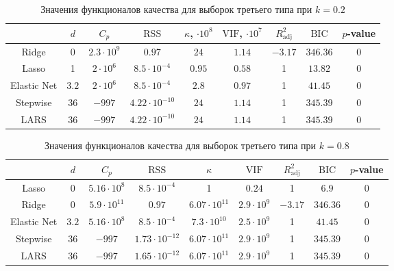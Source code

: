 \documentclass[a4paper,12pt]{article}
\newcommand{\vif}{\mathrm{VIF}}
\newcommand{\rss}{\mathrm{RSS}}
\newcommand{\bic}{\mathrm{BIC}}
\newcommand{\radj}{R_{\text{adj}}^2}
\begin{document}
\begin{table}[h]
\caption{Значения функционалов качества для выборок третьего типа при $k = 0.2$}
\centering
\begin{tabular}{|c|c|c|c|c|c|c|c|c|}
\hline 
 & $d$ & $C_p$ & $\rss$ & $\kappa$, $\cdot 10^8$ & $\vif$, $\cdot 10^7$ & $\radj$ & $\bic$ & $p$-value \\ 
\hline
Ridge & 0 & $2.3 \cdot 10^9 $ & $ 0.97 $ & $24$ & $ 1.14$ & $-3.17$ & $346.36$ & 0 \\ 
\hline 
Lasso & 1  & $2\cdot 10^6$ & $8.5 \cdot 10^{-4}$  & $0.95$ & $0.58$ & 1 & $13.82$ & 0 \\ 
\hline
Elastic Net & $3.2$ & $2 \cdot 10^6$ & $8.5 \cdot 10^{-4}$  & $2.8$ & $0.97$ & 1 & $41.45$  & 0 \\ 
\hline 
Stepwise & 36 & $-997$ & $4.22 \cdot 10^{-10}$  & $24$  & $ 1.14$ & 1  & $345.39$ & 0 \\
\hline 
LARS & 36 & $-997$ & $4.22 \cdot 10^{-10}$ & $24$ & $1.14$ & 1 & $345.39$ & 0 \\ 
\hline 
\end{tabular}
\label{tab:coltarget_0.2}
\end{table}

\begin{table}[h]
\centering
\caption{Значения функционалов качества для выборок третьего типа при $k = 0.8$}
\begin{tabular}{|c|c|c|c|c|c|c|c|c|}
\hline 
 & $d$ & $C_p$ & $\rss$ & $\kappa$ & $\vif$ & $\radj$ & $\bic$ & $p$-value \\ 
\hline 
Lasso & 0 & $5.16 \cdot 10^8$ & $8.5 \cdot 10^{-4}$ & 1 & $0.24$ & 1 & $6.9$ & 0 \\ 
\hline
Ridge & 0 & $5.9 \cdot 10^{11}$ & $0.97$ & $6.07 \cdot 10^{11}$ & $2.9 \cdot 10^9$ & $-3.17$ & $346.36$  & 0\\  
\hline 
Elastic Net & $3.2$ & $5.16 \cdot 10^8$ & $8.5 \cdot 10^{-4}$ & $7.3 \cdot 10^{10}$ & $2.5 \cdot 10^9$ & 1  & $41.45$ & 0 \\ 
\hline  
Stepwise & 36 & $-997$ & $1.73 \cdot 10^{-12}$ & $ 6.07 \cdot 10^{11}$ & $ 2.9 \cdot 10^9 $ & 1 & $345.39$ & 0 \\
\hline
LARS & 36 & $-997$ & $ 1.65 \cdot 10^{-12} $ & $6.07 \cdot 10^11$ & $ 2.9 \cdot 10^9$ & 1 & $ 345.39$ & 0\\
\hline
\end{tabular}
\label{tab:coltarget_0.8}
\end{table}
\end{document}
